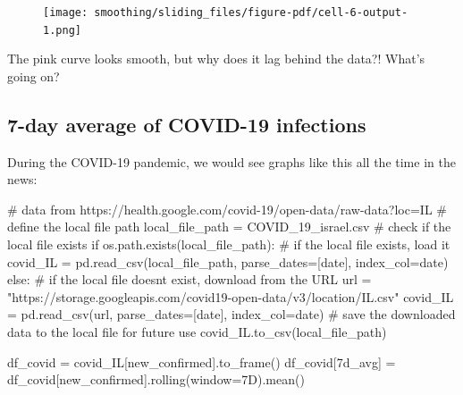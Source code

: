 \documentclass[
  letterpaper,
  DIV=11,
  numbers=noendperiod,
  oneside]{scrreprt}
\newenvironment{Shaded}{\begin{snugshade}}{\end{snugshade}}
\newcommand{\CommentTok}[1]{\textcolor[rgb]{0.37,0.37,0.37}{#1}}
\newcommand{\ControlFlowTok}[1]{\textcolor[rgb]{0.00,0.23,0.31}{#1}}
\newcommand{\NormalTok}[1]{\textcolor[rgb]{0.00,0.23,0.31}{#1}}
\newcommand{\OperatorTok}[1]{\textcolor[rgb]{0.37,0.37,0.37}{#1}}
\newcommand{\StringTok}[1]{\textcolor[rgb]{0.13,0.47,0.30}{#1}}
\begin{document}
\begin{figure}[H]

{\centering \texttt{[image: smoothing/sliding\_files/figure-pdf/cell-6-output-1.png]}

}

\end{figure}

The pink curve looks smooth, but why does it lag behind the data?!
What's going on?

\hypertarget{day-average-of-covid-19-infections}{%
\subsection{7-day average of COVID-19
infections}\label{day-average-of-covid-19-infections}}

During the COVID-19 pandemic, we would see graphs like this all the time
in the news:

\begin{Shaded}
\begin{Highlighting}[]
\CommentTok{\# data from https://health.google.com/covid{-}19/open{-}data/raw{-}data?loc=IL}
\CommentTok{\# define the local file path}
\NormalTok{local\_file\_path }\OperatorTok{=} \StringTok{\textquotesingle{}COVID\_19\_israel.csv\textquotesingle{}}
\CommentTok{\# check if the local file exists}
\ControlFlowTok{if}\NormalTok{ os.path.exists(local\_file\_path):}
    \CommentTok{\# if the local file exists, load it}
\NormalTok{    covid\_IL }\OperatorTok{=}\NormalTok{ pd.read\_csv(local\_file\_path, parse\_dates}\OperatorTok{=}\NormalTok{[}\StringTok{\textquotesingle{}date\textquotesingle{}}\NormalTok{], index\_col}\OperatorTok{=}\StringTok{\textquotesingle{}date\textquotesingle{}}\NormalTok{)}
\ControlFlowTok{else}\NormalTok{:}
    \CommentTok{\# if the local file doesn\textquotesingle{}t exist, download from the URL}
\NormalTok{    url }\OperatorTok{=} \StringTok{"https://storage.googleapis.com/covid19{-}open{-}data/v3/location/IL.csv"}
\NormalTok{    covid\_IL }\OperatorTok{=}\NormalTok{ pd.read\_csv(url, parse\_dates}\OperatorTok{=}\NormalTok{[}\StringTok{\textquotesingle{}date\textquotesingle{}}\NormalTok{], index\_col}\OperatorTok{=}\StringTok{\textquotesingle{}date\textquotesingle{}}\NormalTok{)}
    \CommentTok{\# save the downloaded data to the local file for future use}
\NormalTok{    covid\_IL.to\_csv(local\_file\_path)}

\NormalTok{df\_covid }\OperatorTok{=}\NormalTok{ covid\_IL[}\StringTok{\textquotesingle{}new\_confirmed\textquotesingle{}}\NormalTok{].to\_frame()}
\NormalTok{df\_covid[}\StringTok{\textquotesingle{}7d\_avg\textquotesingle{}}\NormalTok{] }\OperatorTok{=}\NormalTok{ df\_covid[}\StringTok{\textquotesingle{}new\_confirmed\textquotesingle{}}\NormalTok{].rolling(window}\OperatorTok{=}\StringTok{\textquotesingle{}7D\textquotesingle{}}\NormalTok{).mean()}
\end{Highlighting}
\end{Shaded}
\end{document}
